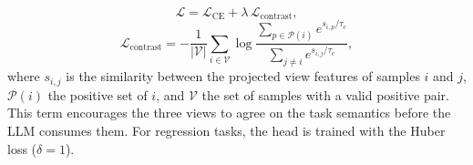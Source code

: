 \begin{equation}
  \mathcal{L} = \mathcal{L}_{\mathrm{CE}} + \lambda \,\mathcal{L}_{\mathrm{contrast}},
\end{equation}
\begin{equation}
  \mathcal{L}_{\mathrm{contrast}} =
    - \frac{1}{|\mathcal{V}|} \sum_{i \in \mathcal{V}}
      \log \frac{\sum_{p \in \mathcal{P}(i)} e^{s_{i,p}/\tau_c}}
                 {\sum_{j \neq i} e^{s_{i,j}/\tau_c}},
\end{equation}
where $s_{i,j}$ is the similarity between the projected view features of
samples $i$ and $j$, $\mathcal{P}(i)$ the positive set of $i$, and
$\mathcal{V}$ the set of samples with a valid positive pair. This term
encourages the three views to agree on the task semantics before the LLM
consumes them. For regression tasks, the head is trained with the Huber loss
($\delta = 1$).
